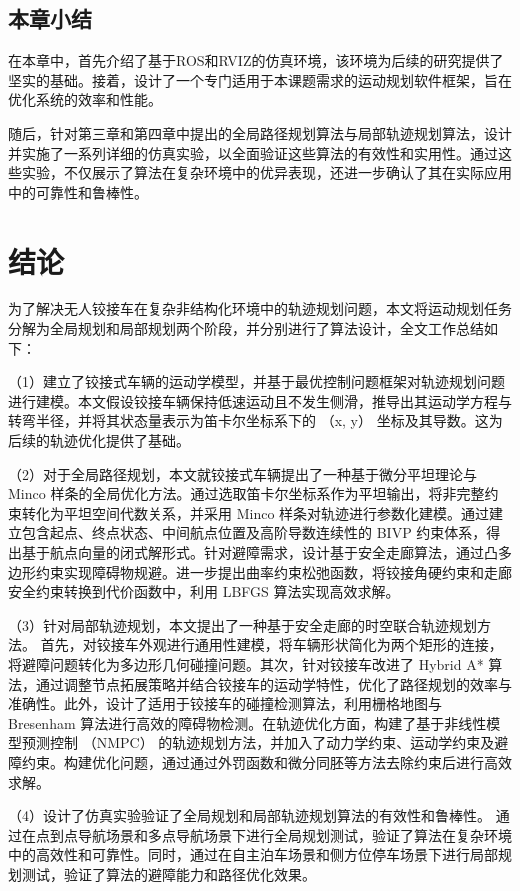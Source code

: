 \documentclass[master,academic]{ysuthesis} %
\begin{document}
	\section{本章小结}
	在本章中，首先介绍了基于ROS和RVIZ的仿真环境，该环境为后续的研究提供了坚实的基础。接着，设计了一个专门适用于本课题需求的运动规划软件框架，旨在优化系统的效率和性能。

	随后，针对第三章和第四章中提出的全局路径规划算法与局部轨迹规划算法，设计并实施了一系列详细的仿真实验，以全面验证这些算法的有效性和实用性。通过这些实验，不仅展示了算法在复杂环境中的优异表现，还进一步确认了其在实际应用中的可靠性和鲁棒性。

	\chapter{结论}
	为了解决无人铰接车在复杂非结构化环境中的轨迹规划问题，本文将运动规划任务分解为全局规划和局部规划两个阶段，并分别进行了算法设计，全文工作总结如下：

	（1）建立了铰接式车辆的运动学模型，并基于最优控制问题框架对轨迹规划问题进行建模。本文假设铰接车辆保持低速运动且不发生侧滑，推导出其运动学方程与转弯半径，并将其状态量表示为笛卡尔坐标系下的 （x, y） 坐标及其导数。这为后续的轨迹优化提供了基础。

	（2）对于全局路径规划，本文就铰接式车辆提出了一种基于微分平坦理论与 Minco 样条的全局优化方法。通过选取笛卡尔坐标系作为平坦输出，将非完整约束转化为平坦空间代数关系，并采用 Minco 样条对轨迹进行参数化建模。通过建立包含起点、终点状态、中间航点位置及高阶导数连续性的 BIVP 约束体系，得出基于航点向量的闭式解形式。针对避障需求，设计基于安全走廊算法，通过凸多边形约束实现障碍物规避。进一步提出曲率约束松弛函数，将铰接角硬约束和走廊安全约束转换到代价函数中，利用 LBFGS 算法实现高效求解。

	（3）针对局部轨迹规划，本文提出了一种基于安全走廊的时空联合轨迹规划方法。 首先，对铰接车外观进行通用性建模，将车辆形状简化为两个矩形的连接，将避障问题转化为多边形几何碰撞问题。其次，针对铰接车改进了 Hybrid A* 算法，通过调整节点拓展策略并结合铰接车的运动学特性，优化了路径规划的效率与准确性。此外，设计了适用于铰接车的碰撞检测算法，利用栅格地图与 Bresenham 算法进行高效的障碍物检测。在轨迹优化方面，构建了基于非线性模型预测控制 （NMPC） 的轨迹规划方法，并加入了动力学约束、运动学约束及避障约束。构建优化问题，通过通过外罚函数和微分同胚等方法去除约束后进行高效求解。

	（4）设计了仿真实验验证了全局规划和局部轨迹规划算法的有效性和鲁棒性。 通过在点到点导航场景和多点导航场景下进行全局规划测试，验证了算法在复杂环境中的高效性和可靠性。同时，通过在自主泊车场景和侧方位停车场景下进行局部规划测试，验证了算法的避障能力和路径优化效果。
\end{document}
